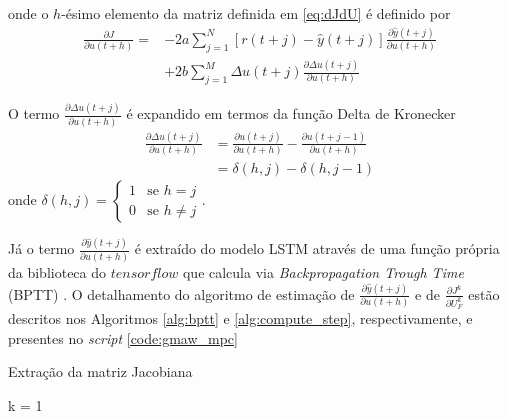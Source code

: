 onde o $h$-ésimo elemento da matriz definida em \ref{eq:dJdU} é definido por 
\begin{align}\label{eq:dJdu}
    \frac{\partial J}{\partial u(t+h)} = &-2a\sum_{j=1}^N [r(t+j) - \hat{y}(t+j)] \frac{\partial \hat{y}(t+j)}{\partial u(t+h)} \\
    &+2b\sum_{j=1}^M \Delta u(t+j) \frac{\partial \Delta u(t+j)}{\partial u(t+h)}
\end{align}

O termo $\frac{\partial \Delta u(t+j)}{\partial u(t+h)}$ é expandido em termos da função Delta de Kronecker 
\begin{align}
    \frac{\partial \Delta u(t+j)}{\partial u(t+h)} &= \frac{\partial u(t+j)}{\partial u(t+h)} - \frac{\partial u(t+j-1)}{\partial u(t+h)} \\
    &= \delta(h,j) - \delta(h,j-1)
\end{align}
onde $\delta(h,j)=\begin{cases}
    1 & \text{se } h=j \\
    0 & \text{se } h \neq j
\end{cases}$. 

Já o termo $\frac{\partial \hat{y}(t+j)}{\partial u(t+h)}$ é extraído do modelo LSTM através de uma função própria da biblioteca do $tensorflow$ \cite{tensorflow2015} que calcula via \textit{Backpropagation Trough Time} (BPTT) \cite{lillicrap2019backpropagation}. O detalhamento do algoritmo de estimação de $\frac{\partial \hat{y}(t+j)}{\partial u(t+h)}$ e de $\frac{\partial J^k}{\partial U_F^k}$ estão descritos nos Algoritmos \ref{alg:bptt} e \ref{alg:compute_step}, respectivamente, e presentes no \textit{script} \ref{code:gmaw_mpc}
\newpage
\begin{algorithm}{
    \label{alg:bptt}
    \caption{Extração da matriz Jacobiana}
    k = 1\;\\
}
\end{algorithm}

